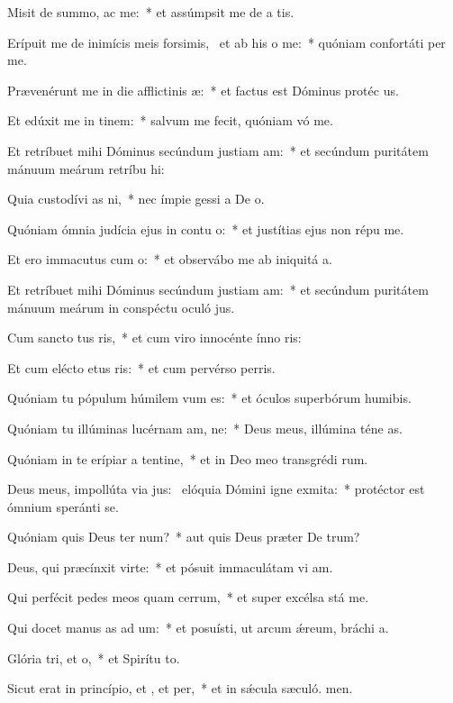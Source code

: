 \item Misit de summo,  ac me:~* et assúmpsit me de a tis.
\item Erípuit me de inimícis meis forsimis,~\pscross{} et ab his  o me:~* quóniam confortáti  per me.
\item Prævenérunt me in die afflictinis æ:~* et factus est Dóminus protéc us.
\item Et edúxit me in tinem:~* salvum me fecit, quóniam vó me.
\item Et retríbuet mihi Dóminus secúndum justiam am:~* et secúndum puritátem mánuum meárum retríbu hi:
\item Quia custodívi as ni,~* nec ímpie gessi a De o.
\item Quóniam ómnia judícia ejus in contu o:~* et justítias ejus non répu  me.
\item Et ero immacutus cum o:~* et observábo me ab iniquitá a.
\item Et retríbuet mihi Dóminus secúndum justiam am:~* et secúndum puritátem mánuum meárum in conspéctu oculó jus.
\item Cum sancto tus ris,~* et cum viro innocénte ínno ris:
\item Et cum elécto etus ris:~* et cum pervérso perris.
\item Quóniam tu pópulum húmilem vum es:~* et óculos superbórum humibis.
\item Quóniam tu illúminas lucérnam am, ne:~* Deus meus, illúmina téne as.
\item Quóniam in te erípiar a tentine,~* et in Deo meo transgrédi rum.
\item Deus meus, impollúta via jus:~\pscross{} elóquia Dómini igne exmita:~* protéctor est ómnium speránti  se.
\item Quóniam quis Deus ter num?~* aut quis Deus præter De trum?
\item Deus, qui præcínxit  virte:~* et pósuit immaculátam vi am.
\item Qui perfécit pedes meos quam cerrum,~* et super excélsa stá me.
\item Qui docet manus as ad um:~* et posuísti, ut arcum ǽreum, bráchi a.
\item Glória tri, et o,~* et Spirítu to.
\item Sicut erat in princípio, et , et per,~* et in sǽcula sæculó. men.
